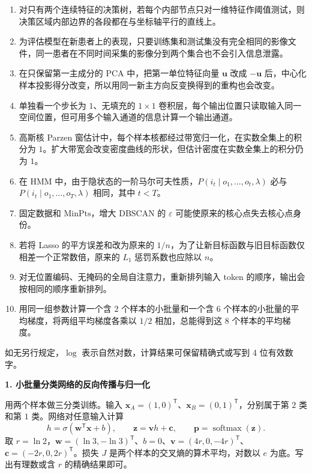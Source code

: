 \begin{enumerate}[label=\arabic*.,start=11]
\item \judge 对只有两个连续特征的决策树，若每个内部节点只对一维特征作阈值测试，则决策区域内部边界的各段都在与坐标轴平行的直线上。
\item \judge 为评估模型在新患者上的表现，只要训练集和测试集没有完全相同的影像文件，同一患者在不同时间采集的影像分到两个集合也不会引入信息泄露。
\item \judge 在只保留第一主成分的 PCA 中，把第一单位特征向量 $\bm u$ 改成 $-\bm u$ 后，中心化样本投影得分改变，所以用同一新主方向反变换得到的重构也会改变。
\item \judge 单独看一个步长为 $1$、无填充的 $1\times1$ 卷积层，每个输出位置只读取输入同一空间位置，但可用多个输入通道的信息计算一个输出通道。
\item \judge 高斯核 Parzen 窗估计中，每个样本核都经过带宽归一化，在实数全集上的积分为 $1$。扩大带宽会改变密度曲线的形状，但估计密度在实数全集上的积分仍为 $1$。
\item \judge 在 HMM 中，由于隐状态的一阶马尔可夫性质，$P(i_t\mid o_1,\ldots,o_t,\lambda)$ 必与 $P(i_t\mid o_1,\ldots,o_T,\lambda)$ 相同，其中 $t<T$。
\item \judge 固定数据和 $\mathrm{MinPts}$，增大 DBSCAN 的 $\varepsilon$ 可能使原来的核心点失去核心点身份。
\item \judge 若将 Lasso 的平方误差和改为原来的 $1/n$，为了让新目标函数与旧目标函数仅相差一个正常数倍，原来的 $L_1$ 惩罚系数也应除以 $n$。
\item \judge 对无位置编码、无掩码的全局自注意力，重新排列输入 token 的顺序，输出会按相同的顺序重新排列。
\item \judge 用同一组参数计算一个含 $2$ 个样本的小批量和一个含 $6$ 个样本的小批量的平均梯度，将两组平均梯度各乘以 $1/2$ 相加，总能得到这 $8$ 个样本的平均梯度。
\end{enumerate}


\noindent 如无另行规定，$\log$ 表示自然对数，计算结果可保留精确式或写到 4 位有效数字。

\noindent\textbf{1. 小批量分类网络的反向传播与归一化}

用两个样本做三分类训练。输入 $\bm{x}_A=(1,0)^{\mathsf T}$、$\bm{x}_B=(0,1)^{\mathsf T}$，分别属于第 $2$ 类和第 $1$ 类。网络对任意输入计算
\[
h=\sigma(\bm{w}^{\mathsf T}\bm{x}+b),\qquad
\bm{z}=\bm{v}h+\bm{c},\qquad \bm{p}=\operatorname{softmax}(\bm{z}).
\]
取 $r=\ln 2$，$\bm{w}=(\ln 3,-\ln 3)^{\mathsf T}$、$b=0$、$\bm{v}=(4r,0,-4r)^{\mathsf T}$、$\bm{c}=(-2r,0,2r)^{\mathsf T}$。损失 $J$ 是两个样本的交叉熵的算术平均，对数以 $e$ 为底。写出有理数或含 $r$ 的精确结果即可。

